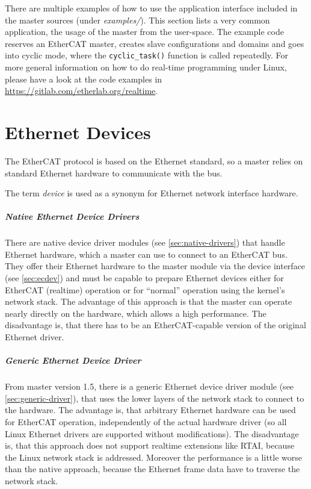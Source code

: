 \documentclass[a4paper,12pt,BCOR=6mm,bibtotoc,idxtotoc]{scrbook}
\begin{document}
There are multiple examples of how to use the application interface included
in the master sources (under \textit{examples/}). This section lists a very
common application, the usage of the master from the user-space. The example
code reserves an EtherCAT master, creates slave configurations and domains and
goes into cyclic mode, where the \lstinline+cyclic_task()+ function is called
repeatedly. For more general information on how to do real-time programming
under Linux, please have a look at the code examples in
\url{https://gitlab.com/etherlab.org/realtime}.




\chapter{Ethernet Devices}
\label{sec:devices}

The EtherCAT protocol is based on the Ethernet standard, so a master relies on
standard Ethernet hardware to communicate with the bus.

The term \textit{device} is used as a synonym for Ethernet network interface
hardware.

\paragraph{Native Ethernet Device Drivers} There are native device driver
modules (see \autoref{sec:native-drivers}) that handle Ethernet hardware,
which a master can use to connect to an EtherCAT bus. They offer their
Ethernet hardware to the master module via the device interface (see
\autoref{sec:ecdev}) and must be capable to prepare Ethernet devices either
for EtherCAT (realtime) operation or for ``normal'' operation using the
kernel's network stack. The advantage of this approach is that the master can
operate nearly directly on the hardware, which allows a high performance. The
disadvantage is, that there has to be an EtherCAT-capable version of the
original Ethernet driver.

\paragraph{Generic Ethernet Device Driver} From master version 1.5, there is a
generic Ethernet device driver module (see \autoref{sec:generic-driver}),
that uses the lower layers of the network stack to connect to the hardware.
The advantage is, that arbitrary Ethernet hardware can be used for EtherCAT
operation, independently of the actual hardware driver (so all Linux Ethernet
drivers are supported without modifications). The disadvantage is, that this
approach does not support realtime extensions like RTAI, because the Linux
network stack is addressed. Moreover the performance is a little worse than
the native approach, because the Ethernet frame data have to traverse the
network stack.
\end{document}
